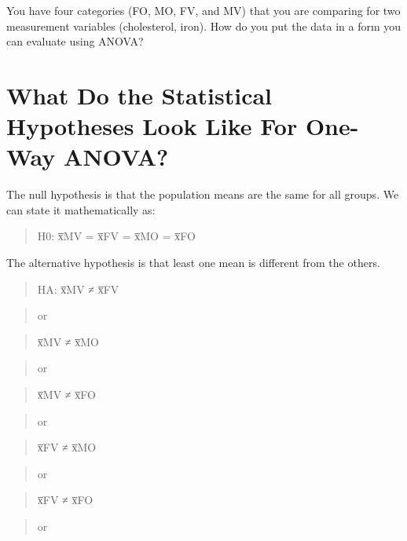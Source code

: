 \documentclass[
]{book}
\begin{document}
You have four categories (FO, MO, FV, and MV) that you are comparing for two measurement variables (cholesterol, iron). How do you put the data in a form you can evaluate using ANOVA?

\hypertarget{what-do-the-statistical-hypotheses-look-like-for-one-way-anova}{%
\section{What Do the Statistical Hypotheses Look Like For One-Way ANOVA?}\label{what-do-the-statistical-hypotheses-look-like-for-one-way-anova}}

The null hypothesis is that the population means are the same for all groups. We can state it mathematically as:

\begin{quote}
H0: x̅MV = x̅FV = x̅MO = x̅FO
\end{quote}

The alternative hypothesis is that least one mean is different from the others.

\begin{quote}
HA: x̅MV ≠ x̅FV
\end{quote}

\begin{quote}
or
\end{quote}

\begin{quote}
x̅MV ≠ x̅MO
\end{quote}

\begin{quote}
or
\end{quote}

\begin{quote}
x̅MV ≠ x̅FO
\end{quote}

\begin{quote}
or
\end{quote}

\begin{quote}
x̅FV ≠ x̅MO
\end{quote}

\begin{quote}
or
\end{quote}

\begin{quote}
x̅FV ≠ x̅FO
\end{quote}

\begin{quote}
or
\end{quote}
\end{document}
